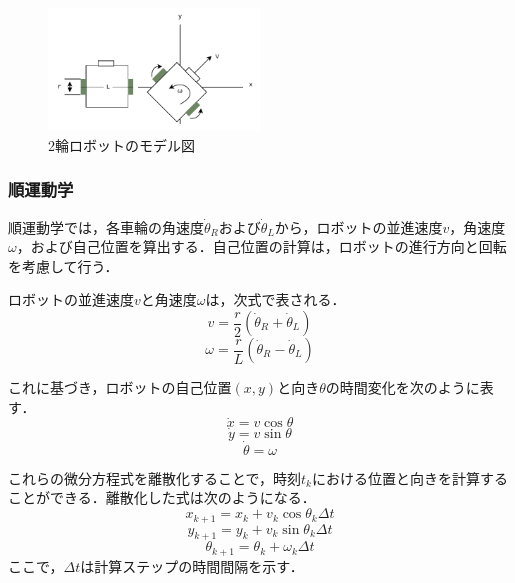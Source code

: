 \begin{figure}[h]
    \centering
    \includegraphics[width=0.5\textwidth]{figure/robot_model.pdf}
    \caption{2輪ロボットのモデル図}
    \label{fig:robot_model}
\end{figure}

\subsubsection{順運動学}
順運動学では，各車輪の角速度$\dot{\theta}_R$および$\dot{\theta}_L$から，ロボットの並進速度$v$，角速度$\omega$，および自己位置を算出する．自己位置の計算は，ロボットの進行方向と回転を考慮して行う．

ロボットの並進速度$v$と角速度$\omega$は，次式で表される．
\begin{equation}
    v = \frac{r}{2} (\dot{\theta}_R + \dot{\theta}_L)
    \label{eq:forward_v}
\end{equation}
\begin{equation}
    \omega = \frac{r}{L} (\dot{\theta}_R - \dot{\theta}_L)
    \label{eq:forward_omega}
\end{equation}

これに基づき，ロボットの自己位置$(x, y)$と向き$\theta$の時間変化を次のように表す．
\begin{equation}
    \dot{x} = v \cos \theta
    \label{eq:forward_x}
\end{equation}
\begin{equation}
    \dot{y} = v \sin \theta
    \label{eq:forward_y}
\end{equation}
\begin{equation}
    \dot{\theta} = \omega
    \label{eq:forward_theta}
\end{equation}

これらの微分方程式を離散化することで，時刻$t_k$における位置と向きを計算することができる．離散化した式は次のようになる．
\begin{equation}
    x_{k+1} = x_k + v_k \cos \theta_k \Delta t
    \label{eq:discrete_x}
\end{equation}
\begin{equation}
    y_{k+1} = y_k + v_k \sin \theta_k \Delta t
    \label{eq:discrete_y}
\end{equation}
\begin{equation}
    \theta_{k+1} = \theta_k + \omega_k \Delta t
    \label{eq:discrete_theta}
\end{equation}
ここで，$\Delta t$は計算ステップの時間間隔を示す．

